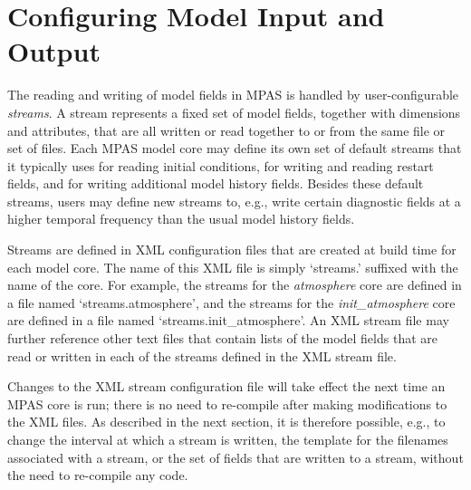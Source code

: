 \chapter{Configuring Model Input and Output}
\label{chap:mpas_io}

\newlength{\immindent}


\newlength{\mutindent}

The reading and writing of model fields in MPAS is handled by user-configurable {\em streams}. 
A stream represents a fixed set of model fields, together with dimensions and attributes, that are
all written or read together to or from the same file or set of files. Each MPAS model core may define
its own set of default streams that it typically uses for reading initial conditions, for writing and reading
restart fields, and for writing additional model history fields. Besides these default streams, users may define
new streams to, e.g., write certain diagnostic fields at a higher temporal frequency than the usual model
history fields.

Streams are defined in XML configuration files that are created at build time for each model core. The name 
of this XML file is simply `streams.' suffixed with the name of the core. For example, the streams for 
the {\em atmosphere} core are defined in a file named `streams.atmosphere', and the streams for 
the {\em init\_atmosphere} core are defined in a file named `streams.init\_atmosphere'. An XML stream
file may further reference other text files that contain lists of the model fields that are read or written in
each of the streams defined in the XML stream file.

Changes to the XML stream configuration file will take effect the next time an MPAS core is run; there is no need
to re-compile after making modifications to the XML files. As described in the next section, it is therefore possible, e.g.,
to change the interval at which a stream is written, the template for the filenames associated with a stream, or the 
set of fields that are written to a stream, without the need to re-compile any code.

